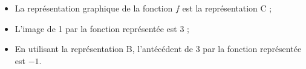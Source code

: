 \begin{enumerate}
\begin{itemize}
\item La représentation graphique de la fonction $f$ est la représentation C ;
\item L'image de 1 par la fonction  représentée est $3$ ;
\item En utilisant la représentation B, l'antécédent de 3 par la fonction représentée est $- 1$.
\end{itemize}

%
%
%

\end{enumerate}

\vspace{0.5cm}

